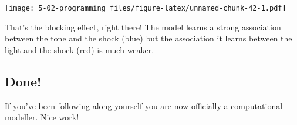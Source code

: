 \documentclass[]{book}
\begin{document}
\texttt{[image: 5-02-programming\_files/figure-latex/unnamed-chunk-42-1.pdf]}

That's the blocking effect, right there! The model learns a strong association between the tone and the shock (blue) but the association it learns between the light and the shock (red) is much weaker.

\hypertarget{done}{%
\subsection{Done!}\label{done}}

If you've been following along yourself you are now officially a computational modeller. Nice work!


\end{document}
